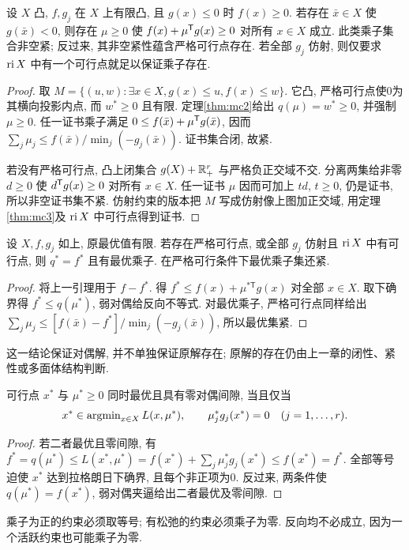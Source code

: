 \begin{theorem}\label{thm:nonlinear-farkas}
设 $X$ 凸, $f,g_j$ 在 $X$ 上有限凸, 且 $g(x)\le0$ 时 $f(x)\ge0$. 若存在 $\bar x\in X$ 使 $g(\bar x)<0$, 则存在 $\mu\ge0$ 使 $f(x)+\mu^{\mathsf T} g(x)\ge0$ 对所有 $x\in X$ 成立. 此类乘子集合非空紧; 反过来, 其非空紧性蕴含严格可行点存在. 若全部 $g_j$ 仿射, 则仅要求 $\operatorname{ri} X$ 中有一个可行点就足以保证乘子存在.
\end{theorem}
\begin{proof}
取 $M=\{(u,w):\exists x\in X,g(x)\le u,f(x)\le w\}$. 它凸, 严格可行点使0为其横向投影内点, 而 $w^*\ge0$ 且有限. 定理\ref{thm:mc2}给出 $q(\mu)=w^*\ge0$, 并强制 $\mu\ge0$. 任一证书乘子满足 $0\le f(\bar x)+\mu^{\mathsf T} g(\bar x)$, 因而 $\sum_j\mu_j\le f(\bar x)/\min_j(-g_j(\bar x))$. 证书集合闭, 故紧.

若没有严格可行点, 凸上闭集合 $g(X)+\mathbb R_+^r$ 与严格负正交域不交. 分离两集给非零 $d\ge0$ 使 $d^{\mathsf T} g(x)\ge0$ 对所有 $x\in X$. 任一证书 $\mu$ 因而可加上 $td$, $t\ge0$, 仍是证书, 所以非空证书集不紧. 仿射约束的版本把 $M$ 写成仿射像上图加正交域, 用定理\ref{thm:mc3}及 $\operatorname{ri} X$ 中可行点得到证书.
\end{proof}
\begin{theorem}[凸规划强对偶]\label{thm:slater}
设 $X,f,g_j$ 如上, 原最优值有限. 若存在严格可行点, 或全部 $g_j$ 仿射且 $\operatorname{ri} X$ 中有可行点, 则 $q^*=f^*$ 且有最优乘子. 在严格可行条件下最优乘子集还紧.
\end{theorem}
\begin{proof}
将上一引理用于 $f-f^*$. 得 $f^*\le f(x)+\mu^{*\mathsf T} g(x)$ 对全部 $x\in X$. 取下确界得 $f^*\le q(\mu^*)$, 弱对偶给反向不等式. 对最优乘子, 严格可行点同样给出 $\sum_j\mu_j\le[f(\bar x)-f^*]/\min_j(-g_j(\bar x))$, 所以最优集紧.
\end{proof}
这一结论保证对偶解, 并不单独保证原解存在; 原解的存在仍由上一章的闭性、紧性或多面体结构判断.

\begin{theorem}[原始--对偶最优性]\label{thm:lagrangian-optimal}
可行点 $x^*$ 与 $\mu^*\ge0$ 同时最优且具有零对偶间隙, 当且仅当
\[
x^*\in\operatorname{argmin}_{x\in X}L(x,\mu^*),\qquad
\mu_j^*g_j(x^*)=0\quad(j=1,\ldots,r).
\]
\end{theorem}
\begin{proof}
若二者最优且零间隙, 有
$f^*=q(\mu^*)\le L(x^*,\mu^*)=f(x^*)+\sum_j\mu_j^*g_j(x^*)\le f(x^*)=f^*$.
全部等号迫使 $x^*$ 达到拉格朗日下确界, 且每个非正项为0. 反过来, 两条件使 $q(\mu^*)=f(x^*)$, 弱对偶夹逼给出二者最优及零间隙.
\end{proof}
乘子为正的约束必须取等号; 有松弛的约束必须乘子为零. 反向均不必成立, 因为一个活跃约束也可能乘子为零.


